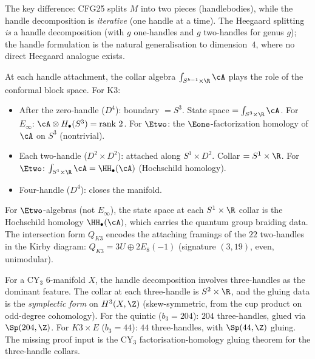 \noindent The key difference: CFG25 splits $M$ into two pieces (handlebodies), while the handle decomposition is \emph{iterative} (one handle at a time). The Heegaard splitting \emph{is} a handle decomposition (with $g$ one-handles and $g$ two-handles for genus $g$); the handle formulation is the natural generalisation to dimension~$4$, where no direct Heegaard analogue exists.

At each handle attachment, the collar algebra $\int_{S^{k-1} \times \R} \cA$ plays the role of the conformal block space. For K3:
\begin{itemize}
 \item After the zero-handle ($D^4$): boundary $= S^3$. State space $= \int_{S^3 \times \R} \cA$. For $E_\infty$: $\cA \otimes H_\bullet(S^3) = \text{rank } 2$.
 For $\Etwo$: the $\Eone$-factorization homology of $\cA$ on $S^3$ (nontrivial).
 \item Each two-handle ($D^2 \times D^2$): attached along $S^1 \times D^2$. Collar $= S^1 \times \R$. For $\Etwo$: $\int_{S^1 \times \R} \cA = \HH_\bullet(\cA)$ (Hochschild homology).
 \item Four-handle ($D^4$): closes the manifold.
\end{itemize}

For $\Etwo$-algebras (not $E_\infty$), the state space at each $S^1 \times \R$ collar is the Hochschild homology $\HH_\bullet(\cA)$, which carries the quantum group braiding data. The intersection form $Q_{K3}$ encodes the attaching framings of the $22$ two-handles in the Kirby diagram: $Q_{K3} = 3U \oplus 2E_8(-1)$ (signature $(3, 19)$, even, unimodular).

\begin{remark}
\label{rem:cy3-handle-extension}
For a CY$_3$ $6$-manifold $X$, the handle decomposition involves three-handles as the dominant feature. The collar at each three-handle is $S^2 \times \R$, and the gluing data is the \emph{symplectic form} on $H^3(X, \Z)$ (skew-symmetric, from the cup product on odd-degree cohomology). For the quintic ($b_3 = 204$): $204$ three-handles, glued via $\Sp(204, \Z)$. For $K3 \times E$ ($b_3 = 44$): $44$ three-handles, with $\Sp(44, \Z)$ gluing. The missing proof input is the CY$_3$ factorisation-homology gluing theorem for the three-handle collars.
\end{remark}

